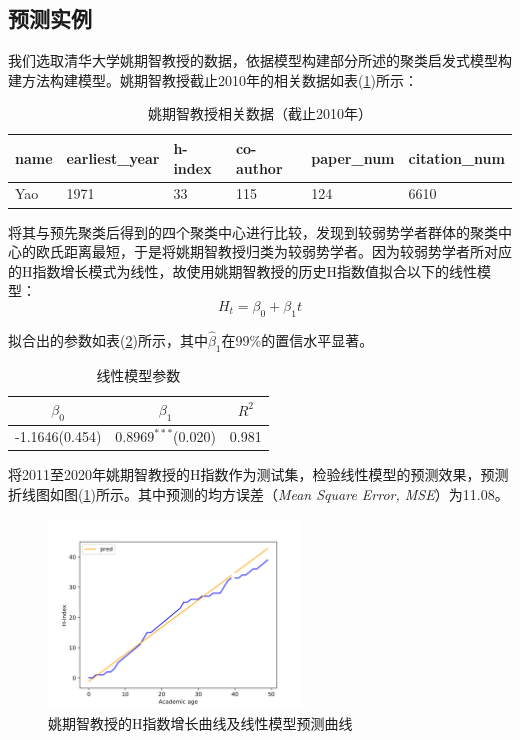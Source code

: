 \documentclass[lang=cn,11pt,a4paper,cite=authoryear]{elegantpaper}
\begin{document}
\subsection{预测实例}

我们选取清华大学姚期智教授的数据，依据模型构建部分所述的聚类启发式模型构建方法构建模型。姚期智教授截止2010年的相关数据如表(\ref{tab2})所示：

\begin{table}[H]
	\centering
	\caption{姚期智教授相关数据（截止2010年）}
	\label{tab2}
	\begin{tabular}{@{}llllll@{}}
		\toprule
		name & earliest\_year & h-index & co-author & paper\_num & citation\_num \\ \midrule
		Yao  & 1971           & 33      & 115       & 124        & 6610          \\ \bottomrule
	\end{tabular}
\end{table}

将其与预先聚类后得到的四个聚类中心进行比较，发现到较弱势学者群体的聚类中心的欧氏距离最短，于是将姚期智教授归类为较弱势学者。因为较弱势学者所对应的H指数增长模式为线性，故使用姚期智教授的历史H指数值拟合以下的线性模型：
$$H_t = \beta_0 + \beta_1 t$$

拟合出的参数如表(\ref{tab3})所示，其中$\hat{\beta}_1$在99\%的置信水平显著。

\begin{table}[H]
	\centering
	\caption{线性模型参数}
	\label{tab3}
	\begin{tabular}{@{}ccc@{}}
		\toprule
		$\beta_0$          & $\beta_1$            & $R^2$    \\ \midrule
		-1.1646(0.454) & $0.8969^{***}$(0.020) & 0.981 \\ \bottomrule
	\end{tabular}
\end{table}

将2011至2020年姚期智教授的H指数作为测试集，检验线性模型的预测效果，预测折线图如图(\ref{fig6})所示。其中预测的均方误差（\textit{Mean Square Error, MSE}）为11.08。

\begin{figure}[H]
	\centering
	\includegraphics[width=0.6\textwidth]{image/yao.png}
	\caption{姚期智教授的H指数增长曲线及线性模型预测曲线}
	\label{fig6}
\end{figure}
\end{document}
